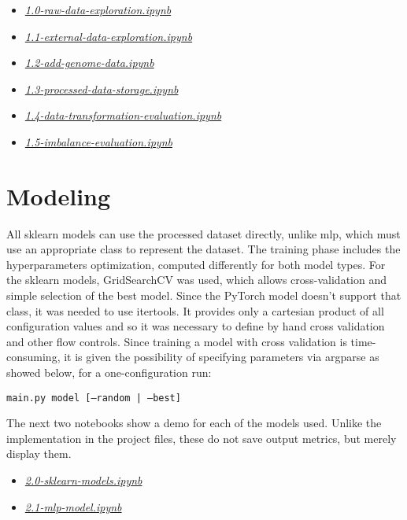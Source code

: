 \documentclass[../main]{subfiles}
\begin{document}
\begin{itemize}
    \item \href{https://github.com/prushh/movie-lens-mlp/blob/main/notebooks/1.0-raw-data-exploration.ipynb}{\textit{1.0-raw-data-exploration.ipynb}}
    \item \href{https://github.com/prushh/movie-lens-mlp/blob/main/notebooks/1.1-external-data-exploration.ipynb}{\textit{1.1-external-data-exploration.ipynb}}
    \item \href{https://github.com/prushh/movie-lens-mlp/blob/main/notebooks/1.2-add-genome-data.ipynb}{\textit{1.2-add-genome-data.ipynb}}
    \item \href{https://github.com/prushh/movie-lens-mlp/blob/main/notebooks/1.3-processed-data-storage.ipynb}{\textit{1.3-processed-data-storage.ipynb}}
    \item \href{https://github.com/prushh/movie-lens-mlp/blob/main/notebooks/1.4-data-transformation-evaluation.ipynb}{\textit{1.4-data-transformation-evaluation.ipynb}}
    \item \href{https://github.com/prushh/movie-lens-mlp/blob/main/notebooks/1.5-imbalance-evaluation.ipynb}{\textit{1.5-imbalance-evaluation.ipynb}}
\end{itemize}

\section{Modeling}
All sklearn models can use the processed dataset directly, unlike mlp, which must use an appropriate class to represent the dataset.
The training phase includes the hyperparameters optimization, computed differently for both model types.
For the sklearn models, GridSearchCV was used, which allows cross-validation and simple selection of the best model.
Since the PyTorch model doesn't support that class, it was needed to use itertools.
It provides only a cartesian product of all configuration values and so it was necessary to define by hand cross validation and other flow controls.
Since training a model with cross validation is time-consuming, it is given the possibility of specifying parameters via argparse as showed below, for a one-configuration run:
\begin{center}
    \texttt{main.py model [--random | --best]}
\end{center}

The next two notebooks show a demo for each of the models used.
Unlike the implementation in the project files, these do not save output metrics, but merely display them.
\begin{itemize}
    \item \href{https://github.com/prushh/movie-lens-mlp/blob/main/notebooks/2.0-sklearn-models.ipynb}{\textit{2.0-sklearn-models.ipynb}}
    \item \href{https://github.com/prushh/movie-lens-mlp/blob/main/notebooks/2.1-mlp-model.ipynb}{\textit{2.1-mlp-model.ipynb}}
\end{itemize}
\end{document}
